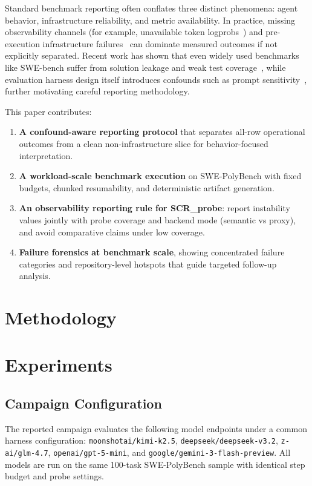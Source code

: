 \documentclass[11pt]{article}
\begin{document}
Standard benchmark reporting often conflates three distinct phenomena: agent behavior, infrastructure reliability, and metric availability. In practice, missing observability channels (for example, unavailable token logprobs~\cite{Chen2025Overconfidence,Tian2023Calibration}) and pre-execution infrastructure failures~\cite{Tang2025Empirical,Patel2025InferenceReliability} can dominate measured outcomes if not explicitly separated. Recent work has shown that even widely used benchmarks like SWE-bench suffer from solution leakage and weak test coverage~\cite{Aleithan2024SWEBenchPlus,Wang2025SavingSWE,yang2024swebenchplus}, while evaluation harness design itself introduces confounds such as prompt sensitivity~\cite{Biderman2024LMEvalHarness}, further motivating careful reporting methodology.

This paper contributes:
\begin{enumerate}
  \item \textbf{A confound-aware reporting protocol} that separates all-row operational outcomes from a clean non-infrastructure slice for behavior-focused interpretation.
  \item \textbf{A workload-scale benchmark execution} on SWE-PolyBench with fixed budgets, chunked resumability, and deterministic artifact generation.
  \item \textbf{An observability reporting rule for SCR\_probe}: report instability values jointly with probe coverage and backend mode (semantic vs proxy), and avoid comparative claims under low coverage.
  \item \textbf{Failure forensics at benchmark scale}, showing concentrated failure categories and repository-level hotspots that guide targeted follow-up analysis.
\end{enumerate}

\section{Methodology}


\section{Experiments}

\subsection{Campaign Configuration}
The reported campaign evaluates the following model endpoints under a common harness configuration: \texttt{moonshotai/kimi-k2.5}, \texttt{deepseek/deepseek-v3.2}, \texttt{z-ai/glm-4.7}, \texttt{openai/gpt-5-mini}, and \texttt{google/gemini-3-flash-preview}. All models are run on the same 100-task SWE-PolyBench sample with identical step budget and probe settings.
\end{document}
